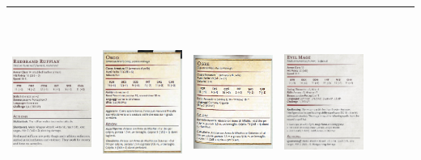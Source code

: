 \documentclass{article}
\begin{document}
\begin{table}
\begin{tabular}{cr|cr|cr|cr}
            \includegraphics[width=4cm,height = 6cm]{../Mostri/Marchi Rossi.PNG} &  \includegraphics[width=4cm,height = 6cm]{../Mostri/Orco.PNG}& \includegraphics[width=4cm,height = 6cm]{../Mostri/Ogre.png}& \includegraphics[width=4cm,height = 6cm]{../Mostri/HalmunKost.png} \\
              \hline
          
    \end{tabular}
     
\end{table}
\end{document}

